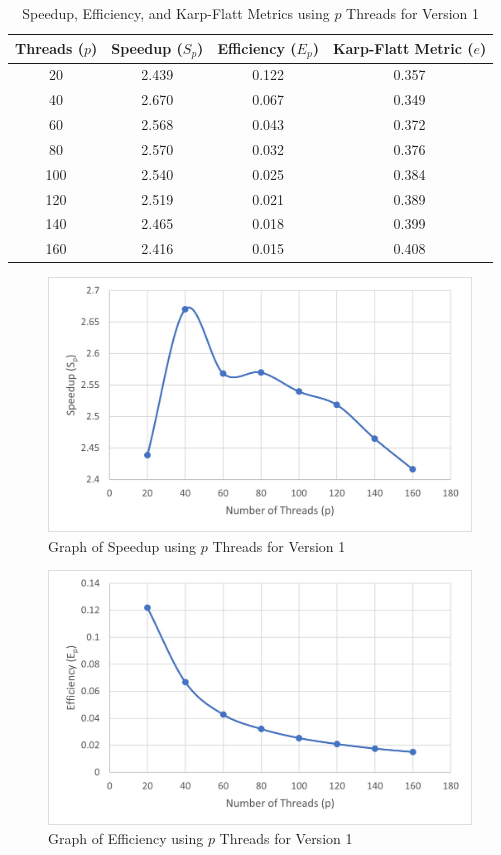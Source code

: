 \begin{table}[H]
    \centering
    \begin{tabular}{cccc}
    \textbf{Threads ($p$)} & \textbf{Speedup ($S_p$)} & \textbf{Efficiency ($E_p$)} & \textbf{Karp-Flatt Metric ($e$)} \\ \hline
    20 & 2.439 & 0.122 & 0.357 \\
    40 & 2.670 & 0.067 & 0.349 \\
    60 & 2.568 & 0.043 & 0.372 \\
    80 & 2.570 & 0.032 & 0.376 \\
    100 & 2.540 & 0.025 & 0.384 \\
    120 & 2.519 & 0.021 & 0.389 \\
    140 & 2.465 & 0.018 & 0.399 \\
    160 & 2.416 & 0.015 & 0.408
    \end{tabular}
    \caption{Speedup, Efficiency, and Karp-Flatt Metrics using $p$ Threads for Version 1}
    \label{tab:metricsv1}
\end{table}

\begin{figure}[H]
    \centering
    \includegraphics{Sp1}
    \caption{Graph of Speedup using $p$ Threads for Version 1}
    \label{fig:Sp1}
\end{figure}

\begin{figure}[H]
    \centering
    \includegraphics{Ep1}
    \caption{Graph of Efficiency using $p$ Threads for Version 1}
    \label{fig:Ep1}
\end{figure}

